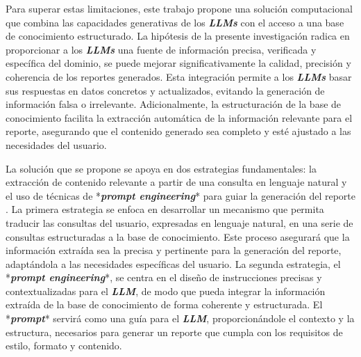 Para superar estas limitaciones, este trabajo propone una solución computacional que combina las capacidades generativas de los \textit{\textbf{LLMs}} con el acceso a una base de conocimiento estructurado. La hipótesis de la presente investigación radica en proporcionar a los \textit{\textbf{LLMs}} una fuente de información precisa, verificada y específica del dominio, se puede mejorar significativamente la calidad, precisión y coherencia de los reportes generados.
Esta integración permite a los \textit{\textbf{LLMs}} basar sus respuestas en datos concretos y actualizados, evitando la generación de información falsa o irrelevante. Adicionalmente, la estructuración de la base de conocimiento facilita la extracción automática de la información relevante para el reporte, asegurando que el contenido generado sea completo y esté ajustado a las necesidades del usuario.

La solución que se propone se apoya en dos estrategias fundamentales: la extracción de contenido relevante a partir de una consulta en lenguaje natural y el uso de técnicas de *\textit{\textbf{prompt engineering}}* para guiar la generación del reporte \cite{liu2023pre}. La primera estrategia se enfoca en desarrollar un mecanismo que permita traducir las consultas del usuario, expresadas en lenguaje natural, en una serie de consultas estructuradas a la base de conocimiento. Este proceso asegurará que la información extraída sea la precisa y pertinente para la generación del reporte, adaptándola a las necesidades específicas del usuario. La segunda estrategia, el *\textit{\textbf{prompt engineering}}*, se centra en el diseño de instrucciones precisas y contextualizadas para el \textit{\textbf{LLM}}, de modo que pueda integrar la información extraída de la base de conocimiento de forma coherente y estructurada. El *\textit{\textbf{prompt}}* servirá como una guía para el \textit{\textbf{LLM}}, proporcionándole el contexto y la estructura, necesarios para generar un reporte que cumpla con los requisitos de estilo, formato y contenido.